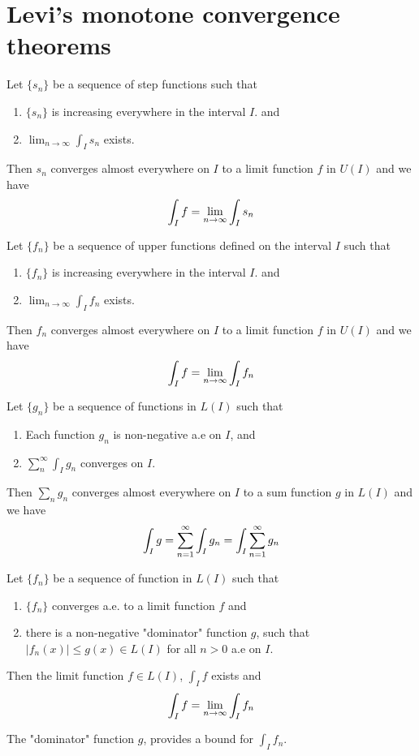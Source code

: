 \documentclass[10pt,a4paper]{book}
\begin{document}
\section*{Levi's monotone convergence theorems}
\begin{Thm}
Let $\{s_n\} $  be a sequence of step functions such that
\begin{enumerate}
    \item $\{s_n\}$ is increasing everywhere in the interval $I$. and
    \item $\lim_{n \to \infty} \int_I s_n $ exists.
\end{enumerate}
Then $s_n$ converges almost everywhere on $I$ to a limit function $f$ in $U(I)$ and we have
$$\int_I f = \lim_{ n \to \infty} \int_I s_n$$
\end{Thm}
\begin{Thm}
Let $\{f_n\} $  be a sequence of upper functions defined on the interval $I$ such that
\begin{enumerate}
    \item $\{f_n\}$ is increasing everywhere in the interval $I$. and
    \item $\lim_{n \to \infty} \int_I f_n $ exists.
\end{enumerate}
Then $f_n$ converges almost everywhere on $I$ to a limit function $f$ in $U(I)$ and we have
$$\int_I f = \lim_{ n \to \infty} \int_I f_n$$
\end{Thm}
\begin{Thm}
Let $\{g_n\} $  be a sequence of functions in $L(I)$ such that
\begin{enumerate}
    \item Each function $g_n$ is non-negative a.e  on $I$, and
    \item $\sum_n^\infty \int_I g_n $ converges on $I$.
\end{enumerate}
Then $\sum_n g_n$ converges almost everywhere on $I$ to a sum function $g$ in $L(I)$ and we have
$$\int_I g = \sum_{n = 1}^\infty\int_I g_n = \int_I \sum_{n = 1}^\infty g_n$$
\end{Thm}

\begin{Thm}
Let $\{f_n\}$ be a sequence of function in $L(I)$ such that
\begin{enumerate}
    \item $\{f_n\}$ converges a.e. to a limit function $f$ and 
    \item there is a  non-negative "dominator" function $g$, such that $|f_n(x)| \leq g(x) \in L(I)$ for all $n > 0$ a.e on $ I.$
\end{enumerate}
Then the limit function $f \in L(I)$, $\int_I f$ exists and
$$\int_I f = \lim_{ n \to \infty} \int_I f_n$$
\end{Thm}
\PP The "dominator" function $g$, provides a bound for $\int_I f_n$.
\end{document}
